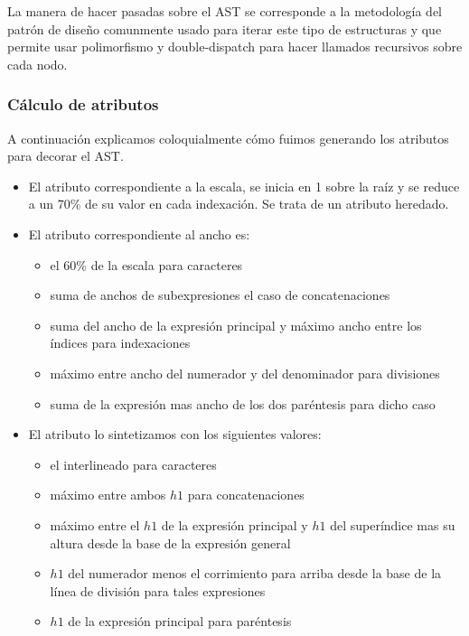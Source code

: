 La manera de hacer pasadas sobre el AST se corresponde a la metodología del patrón de diseño \emph{} comunmente usado para iterar este tipo de estructuras y que permite usar polimorfismo y double-dispatch para hacer llamados recursivos sobre cada nodo.

\subsubsection{Cálculo de atributos}
A continuación explicamos coloquialmente cómo fuimos generando los atributos para decorar el AST.

\begin{itemize}
	\item El atributo \textbf{} correspondiente a la escala, se inicia en 1 sobre la raíz y se reduce a un 70\% de su valor en cada indexación. Se trata de un atributo heredado.

	\item El atributo \textbf{} correspondiente al ancho es:
	\begin{itemize}
		\item el 60\% de la escala para caracteres
		\item suma de anchos de subexpresiones el caso de concatenaciones
		\item suma del ancho de la expresión principal y máximo ancho entre los índices para indexaciones
		\item máximo entre ancho del numerador y del denominador para divisiones
		\item suma de la expresión mas ancho de los dos paréntesis para dicho caso
	\end{itemize}

	\item El atributo \textbf{} lo sintetizamos con los siguientes valores:
	\begin{itemize}
		\item el interlineado para caracteres
		\item máximo entre ambos $h1$ para concatenaciones
		\item máximo entre el $h1$ de la expresión principal y $h1$ del superíndice mas su altura desde la base de la expresión general
		\item $h1$ del numerador menos el corrimiento para arriba desde la base de la línea de división para tales expresiones
		\item $h1$ de la expresión principal para paréntesis
	\end{itemize}


\end{itemize}
